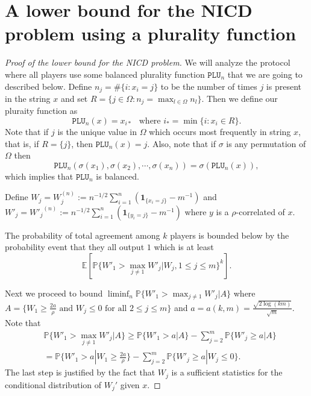 \documentclass[11pt]{amsart}
\newcommand{\E}{\mathbb{E}}
\newcommand{\PP}{\mathbb{P}}
\newcommand{\1}{\mathbf{1}}
\newcommand{\PL}{\texttt{PLU} }
\def\E{{\mathbb E}}
\theoremstyle{definition}
\theoremstyle{plain}
\theoremstyle{remark}
\numberwithin{equation}{section}
\begin{document}
\section{A lower bound for the NICD problem using a plurality function} \label{a:nicd}
\begin{proof}[Proof of the lower bound for the NICD problem]
We will analyze the protocol where all players use some balanced plurality function $\PL_n$ that we are going to described below.
Define $n_j =\#\{ i :x_i = j \}$ to be the number of times $j$ is present in the string $x$ and set $R = \{ j \in \Omega : n_j = \max_{l \in \Omega} n_l \}$. Then we define our pluraity function as
\[ \PL_n(x) = x_{i*} \ \ \text{ where } i_* =\min\{i : x_i \in R \}.    \]
Note that if $j$ is the unique value in $\Omega$ which occurs most frequently in string $x$, that is, if $R = \{j\}$,  then $\PL_n(x) = j$. Also, note that if $\sigma$ is any permutation of $\Omega$ then
\[ \PL_n(\sigma(x_1), \sigma(x_2), \cdots, \sigma(x_n)) = \sigma (\PL_n(x)),\]
which implies that $\PL_n$ is balanced.

Define $W_{j} = W_{j}^{(n)} :=  n^{-1/2} \sum_{ i=1}^n (\1_{\{x_i = j \}} - m^{-1})$ and $W'_{j} = {W'_{j}}^{(n)} :=  n^{-1/2} \sum_{ i=1}^n (\1_{\{y_i = j \}} - m^{-1})$ where $y$ is a $\rho$-correlated of $x$.


The probability of total agreement among $k$ players is bounded below by the probability event that they all output $1$ which is at least
\begin{equation}\label{eq:lwbnd_dice}
  \E \left [ \PP\{ W'_1  >  \max_{ j\ne 1} W'_j | W_j, 1\le j \le m \}^k \right].
  \end{equation}


Next we proceed to bound $\liminf_n \PP\{ W'_1  >  \max_{ j\ne 1} W'_j | A \}$ where
$ A = \{ W_1 \ge  \tfrac{2a}{\rho}  \text{ and } W_j \le  0 \text{ for all } 2 \le j \le m \}$ and $a = a(k, m) = \tfrac{\sqrt{2 \log(km)}}{\sqrt{m}}$.
Note that
\begin{align*}
&\PP\{ W'_1  >  \max_{ j\ne 1} W'_j | A\} \ge \PP\{ W'_1  >  a | A\}  - \sum_{j=2}^m \PP\{ W'_j  \ge   a  | A\} \\
 &= \PP\{ W'_1  > a   | W_1 \ge   \tfrac{2a}{\rho}   \}  - \sum_{j=2}^m \PP\{ W'_j  \ge   a  | W_j \le 0\}.
\end{align*}
The last step is justified by the fact that $W_j$ is a sufficient statistics for the conditional distribution of $W_j' $ given $x$.


\end{proof}
\end{document}
